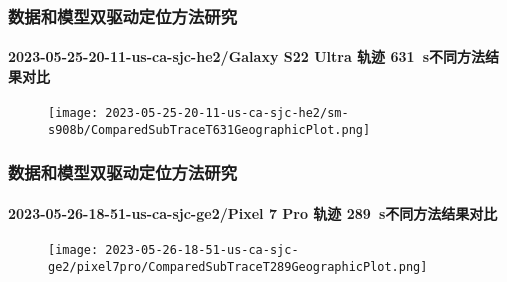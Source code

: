 \begin{frame}
	\frametitle{数据和模型双驱动定位方法研究}
	\framesubtitle{2023-05-25-20-11-us-ca-sjc-he2/Galaxy S22 Ultra 轨迹 \SI{631}{\second}不同方法结果对比}
   	\begin{figure}
   	\centering
   	    \texttt{[image: 2023-05-25-20-11-us-ca-sjc-he2/sm-s908b/ComparedSubTraceT631GeographicPlot.png]}
   	\end{figure} 
\end{frame}

\begin{frame}
	\frametitle{数据和模型双驱动定位方法研究}
	\framesubtitle{2023-05-26-18-51-us-ca-sjc-ge2/Pixel 7 Pro 轨迹 \SI{289}{\second}不同方法结果对比}
   	\begin{figure}
   	\centering
   	    \texttt{[image: 2023-05-26-18-51-us-ca-sjc-ge2/pixel7pro/ComparedSubTraceT289GeographicPlot.png]}
   	\end{figure} 
\end{frame}
